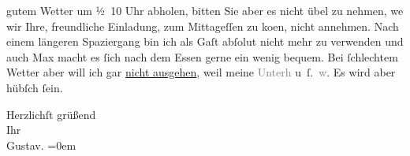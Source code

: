                gutem Wetter um ½ 10 Uhr abholen, bitten Sie aber es nicht übel zu
               nehmen, we{\geminationn} wir Ihre, freundliche Einladung, zum
               Mittageſſen zu ko{\geminationm}en, nicht annehmen. Nach einem
               längeren Spaziergang bin ich als Gaſt abſolut nicht mehr zu verwenden und auch 
                  Max
                macht es{ }ſich nach dem Essen gerne ein wenig bequem. Bei{ }ſchlechtem Wetter aber
               will ich gar \uline{nicht ausgehen}, weil meine
                  \textcolor{gray}{Unterh} u ſ. \textcolor{gray}{w}. Es wird aber hübſch{ }ſein.\pend
           
\pstart
           Herzlichſt grüßend{\\[\baselineskip]}Ihr{\\[\baselineskip]}\spacefill\mbox{Gustav.}\pend
           \leftskip=0em{}\endnumbering{}
\begin{anhang}
\end{anhang}\newcommand{\dateiname}{L04269}\newcommand{\titel}{Gustav Schwarzkopf an Arthur Schnitzler, 14. 4. 1906}\newcommand{\editorInnen}{Herausgegeben von Jahnke, SelmaMüller, Martin Anton}
